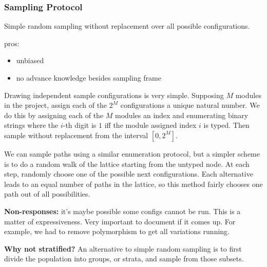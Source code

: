 \documentclass{article}
\begin{document}


\subsubsection{Sampling Protocol}
Simple random sampling without replacement over all possible configurations.

pros:
\begin{itemize}
\item unbiased
\item no advance knowledge besides sampling frame
\end{itemize}

Drawing independent sample configurations is very simple.
Supposing $M$ modules in the project, assign each of the $2^M$ configurations a unique natural number.
We do this by assigning each of the $M$ modules an index and enumerating binary strings where the $i$-th digit is $1$ iff the module assigned index $i$ is typed.
Then sample without replacement from the interval $[0, 2^M]$.

We can sample paths using a similar enumeration protocol, but a simpler scheme is to do a random walk of the lattice starting from the untyped node.
At each step, randomly choose one of the possible next configurations.
Each alternative leads to an equal number of paths in the lattice, so this method fairly chooses one path out of all possibilities.


\textbf{Non-responses:} it's maybe possible some configs cannot be run.
This is a matter of expressiveness.
Very important to document if it comes up.
For example, we had to remove polymorphism to get all variations running.

\textbf{Why not stratified?}
An alternative to simple random sampling is to first divide the population into groups, or strata, and sample from those subsets.
\end{document}
